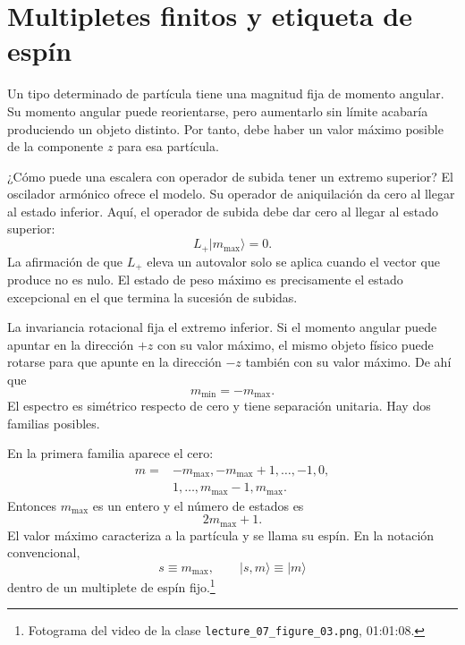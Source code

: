 \section{Multipletes finitos y etiqueta de espín}

Un tipo determinado de partícula tiene una magnitud fija de momento angular. Su momento angular puede reorientarse, pero aumentarlo sin límite acabaría produciendo un objeto distinto. Por tanto, debe haber un valor máximo posible de la componente \(z\) para esa partícula.

¿Cómo puede una escalera con operador de subida tener un extremo superior? El oscilador armónico ofrece el modelo. Su operador de aniquilación da cero al llegar al estado inferior. Aquí, el operador de subida debe dar cero al llegar al estado superior:
\begin{equation}
L_+\lvert m_{\max}\rangle=0.
\end{equation}
La afirmación de que \(L_+\) eleva un autovalor solo se aplica cuando el vector que produce no es nulo. El estado de peso máximo es precisamente el estado excepcional en el que termina la sucesión de subidas.

La invariancia rotacional fija el extremo inferior. Si el momento angular puede apuntar en la dirección \(+z\) con su valor máximo, el mismo objeto físico puede rotarse para que apunte en la dirección \(-z\) también con su valor máximo. De ahí que
\begin{equation}
m_{\min}=-m_{\max}.
\end{equation}
El espectro es simétrico respecto de cero y tiene separación unitaria. Hay dos familias posibles.

En la primera familia aparece el cero:
\begin{equation}
\begin{aligned}
m={}&-m_{\max},-m_{\max}+1,\ldots,-1,0,\\
&1,\ldots,m_{\max}-1,m_{\max}.
\end{aligned}
\end{equation}
Entonces \(m_{\max}\) es un entero y el número de estados es
\begin{equation}
2m_{\max}+1.
\end{equation}
El valor máximo caracteriza a la partícula y se llama su espín. En la notación convencional,
\begin{equation}
s\equiv m_{\max},
\qquad
\lvert s,m\rangle\equiv\lvert m\rangle
\end{equation}
dentro de un multiplete de espín fijo.\footnote{\raggedright Fotograma del video de la clase \nolinkurl{lecture_07_figure_03.png}, 01:01:08.\par}

